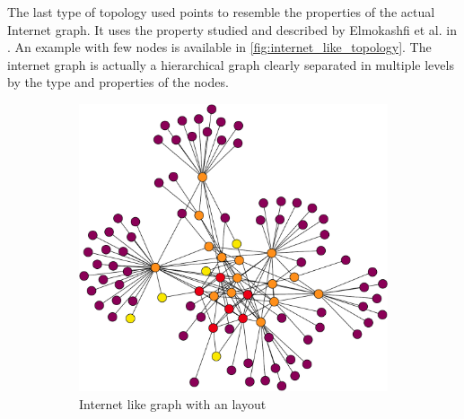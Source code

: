 The last type of topology used points to resemble the properties of the actual
Internet graph.
It uses the property studied and described by Elmokashfi et al. in \cite{elmokashfi2010scalability}.
An example with few nodes is available in \cref{fig:internet_like_topology}.
The internet graph is actually a hierarchical graph clearly separated in multiple
levels by the type and properties of the nodes.

\begin{figure}[ht]
     \centering
     \begin{subfigure}[b]{0.8\textwidth}
		 \centering
		 
     \end{subfigure}
     \begin{subfigure}[b]{0.49\textwidth}
         \centering
         \includegraphics[width=\textwidth]{images/internet_graph/graph-100-colored.pdf}
		 \caption{Internet like graph with an  layout}
         \label{fig:internet_topology_explosive}
     \end{subfigure}
     \hfill
     \begin{subfigure}[b]{0.49\textwidth}
         \centering

\end{subfigure}
\end{figure}

